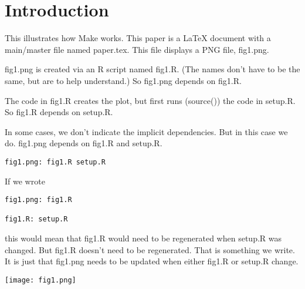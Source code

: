 \documentclass{article}
\begin{document}
\section{Introduction}
This illustrates how Make works.
This paper is a \LaTeX{} document
with a main/master file named paper.tex.
This file displays a PNG file, fig1.png.

fig1.png is created via an R script named fig1.R.
(The names don't have to be the same, but are to help understand.)
So fig1.png depends on fig1.R.

The code in fig1.R creates the plot, but first runs (source()) the code
in setup.R.
So fig1.R depends on setup.R.

In some cases, we don't  indicate the implicit dependencies.
But in this case we do.
fig1.png depends on fig1.R and setup.R.

\begin{verbatim}
fig1.png: fig1.R setup.R

\end{verbatim}

If we wrote
\begin{verbatim}
fig1.png: fig1.R 

fig1.R: setup.R
\end{verbatim}
this would mean that fig1.R would need to be regenerated when setup.R
was changed.
But fig1.R doesn't need to be regenerated. That is something we write.
It is just that fig1.png needs to be updated when either fig1.R or setup.R change.

 

\texttt{[image: fig1.png]}


\end{document}
